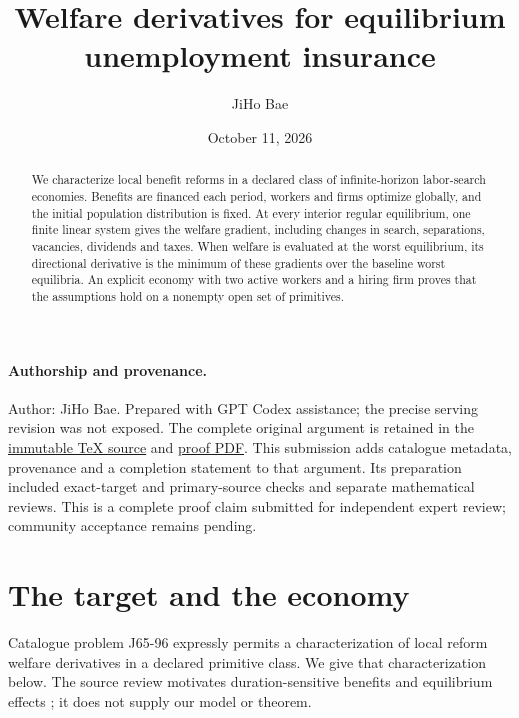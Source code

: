 \documentclass[11pt]{article}
\title{Welfare derivatives for equilibrium unemployment insurance}
\author{JiHo Bae}
\date{October 11, 2026}
\begin{document}
\maketitle

\paragraph{Authorship and provenance.}
Author: JiHo Bae. Prepared with GPT Codex assistance; the precise serving
revision was not exposed. The complete original argument is retained in
the \href{https://github.com/jbaelaw/equilibrium-unemployment-insurance-proof/blob/3de5842fb6f6686849363cd4c9f8dc32a395d02c/paper/Proof.tex}{immutable TeX source} and
\href{https://github.com/jbaelaw/equilibrium-unemployment-insurance-proof/blob/3de5842fb6f6686849363cd4c9f8dc32a395d02c/paper/Proof.pdf}{proof PDF}. This submission adds catalogue metadata,
provenance and a completion statement to that argument. Its preparation
included exact-target and primary-source checks and separate mathematical
reviews. This is a complete proof claim submitted for independent expert
review; community acceptance remains pending.

\begin{abstract}
We characterize local benefit reforms in a declared class of infinite-horizon labor-search economies. Benefits are financed each period, workers and firms optimize globally, and the initial population distribution is fixed. At every interior regular equilibrium, one finite linear system gives the welfare gradient, including changes in search, separations, vacancies, dividends and taxes. When welfare is evaluated at the worst equilibrium, its directional derivative is the minimum of these gradients over the baseline worst equilibria. An explicit economy with two active workers and a hiring firm proves that the assumptions hold on a nonempty open set of primitives.
\end{abstract}

\section{The target and the economy}
Catalogue problem J65-96 expressly permits a characterization of local reform welfare derivatives in a declared primitive class. We give that characterization below. The source review motivates duration-sensitive benefits and equilibrium effects \cite[\S\S3.6.2, 3.7.1, 3.9]{ui}; it does not supply our model or theorem.
\end{document}
